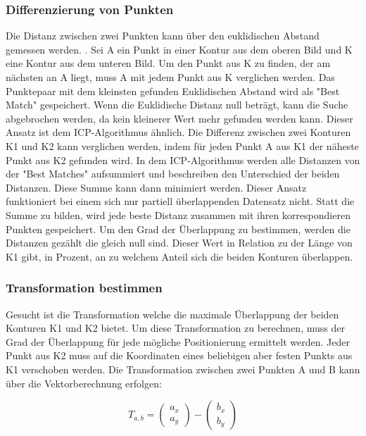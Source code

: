 \subsubsection{Differenzierung von Punkten}

Die Distanz zwischen zwei Punkten kann über den euklidischen Abstand gemessen werden.
\cite{Dokmanic.2015}. Sei A ein Punkt in einer Kontur aus dem oberen Bild und K eine 
Kontur aus dem unteren Bild.  
Um den Punkt aus K zu finden, der am nächsten an A liegt, muss A mit jedem Punkt aus 
K verglichen werden. Das Punktepaar mit dem kleinsten gefunden Euklidischen Abstand 
wird als "Best Match" gespeichert. Wenn die Euklidische Distanz null beträgt, kann 
die Suche abgebrochen werden, da kein kleinerer Wert mehr gefunden werden kann.
Dieser Ansatz ist dem ICP-Algorithmus ähnlich. Die Differenz zwischen zwei Konturen 
K1 und K2 kann verglichen werden, indem für jeden Punkt A aus K1 der näheste Punkt aus 
K2 gefunden wird. In dem ICP-Algorithmus werden alle Distanzen von der "Best Matches" 
aufsummiert und beschreiben den Unterschied der beiden Distanzen. Diese Summe kann dann 
minimiert werden. Dieser Ansatz funktioniert bei einem sich nur partiell
überlappenden Datensatz nicht. 
Statt die Summe zu bilden, wird jede beste Distanz zusammen mit ihren korrespondieren 
Punkten gespeichert. Um den Grad der Überlappung zu bestimmen, werden die Distanzen 
gezählt die gleich null sind. Dieser Wert in Relation zu der Länge von K1 gibt, 
in Prozent, an zu welchem Anteil sich die beiden Konturen überlappen.

\subsubsection*{Transformation bestimmen}

Gesucht ist die Transformation welche die maximale Überlappung der beiden 
Konturen K1 und K2 bietet. Um diese Transformation zu berechnen, muss der 
Grad der Überlappung für jede mögliche Positionierung ermittelt werden. Jeder
Punkt aus K2 muss auf die Koordinaten eines beliebigen aber festen Punkts aus K1 
verschoben werden.
Die Transformation zwischen zwei Punkten A und B kann über die Vektorberechnung erfolgen:

\begin{equation*}
    T_{a,b} = \begin{pmatrix}a_x\\a_y\end{pmatrix} - \begin{pmatrix}b_x\\b_y\end{pmatrix}
\end{equation*}

